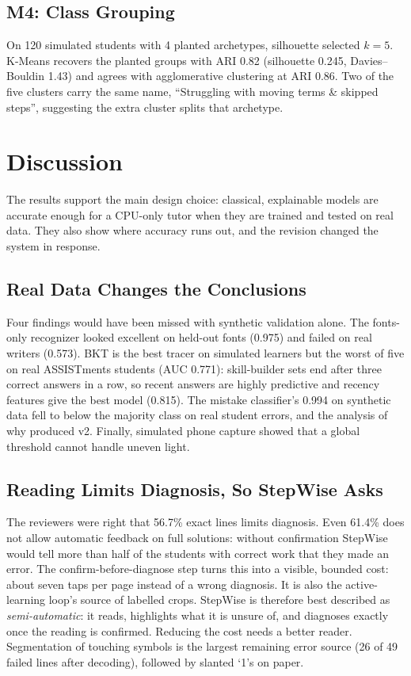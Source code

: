 \documentclass[conference]{IEEEtran}
\begin{document}
\subsection{M4: Class Grouping}
On 120 simulated students with 4 planted archetypes, silhouette selected $k=5$. K-Means recovers the planted groups with ARI 0.82 (silhouette 0.245, Davies--Bouldin 1.43) and agrees with agglomerative clustering at ARI 0.86. Two of the five clusters carry the same name, ``Struggling with moving terms \& skipped steps'', suggesting the extra cluster splits that archetype.

\section{Discussion}
The results support the main design choice: classical, explainable models are accurate enough for a CPU-only tutor when they are trained and tested on real data. They also show where accuracy runs out, and the revision changed the system in response.

\subsection{Real Data Changes the Conclusions}
Four findings would have been missed with synthetic validation alone. The fonts-only recognizer looked excellent on held-out fonts (0.975) and failed on real writers (0.573). BKT is the best tracer on simulated learners but the worst of five on real ASSISTments students (AUC 0.771): skill-builder sets end after three correct answers in a row, so recent answers are highly predictive and recency features give the best model (0.815). The mistake classifier's 0.994 on synthetic data fell to below the majority class on real student errors, and the analysis of why produced v2. Finally, simulated phone capture showed that a global threshold cannot handle uneven light.

\subsection{Reading Limits Diagnosis, So StepWise Asks}
The reviewers were right that 56.7\% exact lines limits diagnosis. Even 61.4\% does not allow automatic feedback on full solutions: without confirmation StepWise would tell more than half of the students with correct work that they made an error. The confirm-before-diagnose step turns this into a visible, bounded cost: about seven taps per page instead of a wrong diagnosis. It is also the active-learning loop's source of labelled crops. StepWise is therefore best described as \textit{semi-automatic}: it reads, highlights what it is unsure of, and diagnoses exactly once the reading is confirmed. Reducing the cost needs a better reader. Segmentation of touching symbols is the largest remaining error source (26 of 49 failed lines after decoding), followed by slanted `1's on paper.
\end{document}
